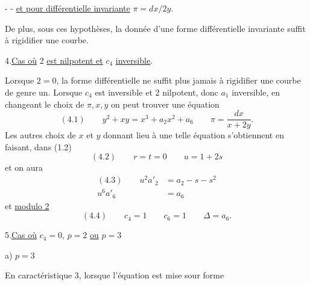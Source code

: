 -  -
\uline{et pour différentielle invariante} $\pi=dx/2y$.

De plus, sous ces hypothèses, la donnée d'une forme différentielle invariante suffit à rigidifier une courbe.

4.\quad \uline{Cas où} 2 \uline{est nilpotent et} $c_4$ \uline{inversible}.

Lorsque $2=0$, la forme différentielle ne suffit plus jamais à rigidifier une courbe de genre un. Lorsque $c_4$ est inversible et 2 nilpotent, donc $a_1$ inversible, en changeant le choix de $\pi,x,y$ on peut trouver une équation
\[
(4.1)\qquad y^2+xy=x^3+a_2x^2+a_6\qquad\pi=\frac{dx}{x+2y}.
\]
Les autres choix de $x$ et $y$ donnant lieu à une telle équation s'obtiennent en faisant, dans (1.2)
\[
(4.2)\qquad r=t=0\qquad u=1+2s
\]
et on aura
\[
\begin{aligned}
(4.3)\qquad u^2a'_2&=a_2-s-s^2\\
u^6a'_6&=a_6
\end{aligned}
\]
et \uline{modulo 2}
\[
(4.4)\qquad c_4=1\qquad c_6=1\qquad\Delta=a_6.
\]

5.\quad \uline{Cas où} $c_4=0$, $p=2$ \uline{ou} $p=3$

a) $p=3$

En caractéristique 3, lorsque l'équation est mise sour forme
